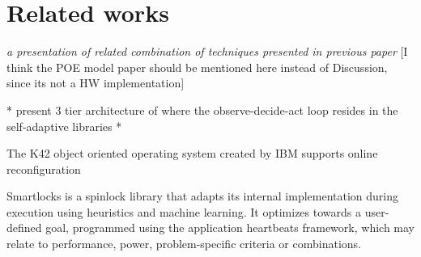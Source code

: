 
\section{Related works}
\label{sec:related}

\emph{a presentation of related combination of techniques presented in previous paper}
[I think the POE model paper should be mentioned here instead of Discussion, since its not a HW implementation]


* present 3 tier architecture of \cite{evolvable} where the observe-decide-act loop resides in the self-adaptive libraries *

The K42 object oriented operating system created by IBM supports online reconfiguration \cite{evolvable}

Smartlocks is a spinlock library that adapts its internal implementation during execution using heuristics and machine learning. It optimizes towards a user-defined goal, programmed using the application heartbeats framework, which may relate to performance, power, problem-specific criteria or combinations. \cite{reconfigurable}
